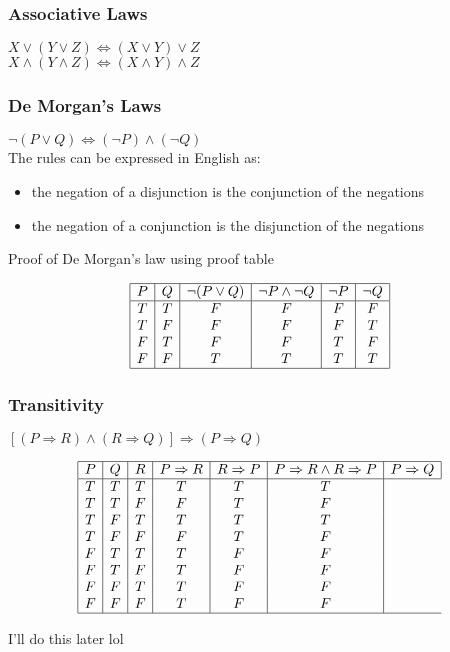 \documentclass[a4paper]{article}
\begin{document}
\subsubsection{Associative Laws}
$X \lor (Y \lor Z) \Leftrightarrow (X \lor Y) \lor Z $\\
$X \land (Y \land Z) \Leftrightarrow (X \land Y) \land Z $

\subsubsection{De Morgan's Laws}
$\lnot (P \lor Q) \Leftrightarrow (\lnot P) \land (\lnot Q)$
\\
The rules can be expressed in English as:
\begin{itemize}
	\item the negation of a disjunction is the conjunction of the negations
	\item the negation of a conjunction is the disjunction of the negations
\end{itemize}
Proof of De Morgan's law using proof table
\begin{center}
	\begin{displaymath}
		\begin{array}{|c|c|c|c|c|c|c|}
			\hline
			P & Q & \lnot (P \lor Q) & \lnot P \land \lnot Q & \lnot P & \lnot Q\\ 
			\hline
			T & T & F & F & F & F\\
			T & F & F & F & F & T\\
			F & T & F & F & T & F\\
			F & F & T & T & T & T\\
			\hline
		\end{array}
	\end{displaymath}
\end{center}

\subsubsection{Transitivity}
$[(P \Rightarrow R) \land (R \Rightarrow Q)] \Rightarrow (P \Rightarrow Q)$

\begin{center}
	\begin{displaymath}
		\begin{array}{|c|c|c|c|c|c|c|}
			\hline
			P & Q & R & P \Rightarrow R & R \Rightarrow P & P \Rightarrow R \land R \Rightarrow P & P \Rightarrow Q \\ 
			\hline
			T & T & T & T & T & T\\
			T & T & F & F & T & F\\
			T & F & T & T & T & T\\
			T & F & F & F & T & F\\
			F & T & T & T & F & F\\
			F & T & F & T & F & F\\
			F & F & T & T & F & F\\
			F & F & F & T & F & F\\
			\hline
		\end{array}
	\end{displaymath}
\end{center}
I'll do this later lol
\end{document}
